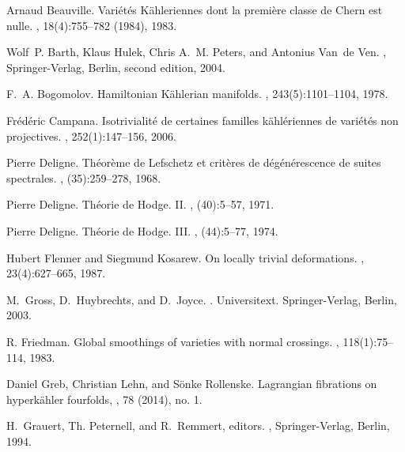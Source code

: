\documentclass[a4paper,11pt,final]{amsart}
\theoremstyle{plain}
\theoremstyle{definition}
\numberwithin{equation}{section}
\theoremstyle{remark}
\begin{document}
\begin{thebibliography}{BHPVdV04}

Arnaud Beauville.
\newblock Vari\'et\'es {K}\"ahleriennes dont la premi\`ere classe de {C}hern
  est nulle.
, 18(4):755--782 (1984), 1983.

Wolf~P. Barth, Klaus Hulek, Chris A.~M. Peters, and Antonius Van~de Ven.
, 
\newblock Springer-Verlag, Berlin, second edition, 2004.

F.~A. Bogomolov.
\newblock Hamiltonian {K}\"ahlerian manifolds.
, 243(5):1101--1104, 1978.

Fr{\'e}d{\'e}ric Campana.
\newblock Isotrivialit\'e de certaines familles k\"ahl\'eriennes de
  vari\'et\'es non projectives.
, 252(1):147--156, 2006.

Pierre Deligne.
\newblock Th\'eor\`eme de {L}efschetz et crit\`eres de d\'eg\'en\'erescence de
  suites spectrales.
, (35):259--278, 1968.

Pierre Deligne.
\newblock Th\'eorie de {H}odge. {II}.
, (40):5--57, 1971.

Pierre Deligne.
\newblock Th\'eorie de {H}odge. {III}.
, (44):5--77, 1974.

Hubert Flenner and Siegmund Kosarew.
\newblock On locally trivial deformations.
, 23(4):627--665, 1987.

M.~Gross, D.~Huybrechts, and D.~Joyce.
.
\newblock Universitext. Springer-Verlag, Berlin, 2003.

R. Friedman.
\newblock Global smoothings of varieties with normal crossings.
, 118(1):75--114, 1983.

Daniel Greb, Christian Lehn, and S\"onke Rollenske.
\newblock Lagrangian fibrations on hyperk\"ahler fourfolds,
, 78 (2014), no. 1.

H.~Grauert, Th. Peternell, and R.~Remmert, editors.
, 
\newblock Springer-Verlag, Berlin, 1994.


\end{thebibliography}
\end{document}
